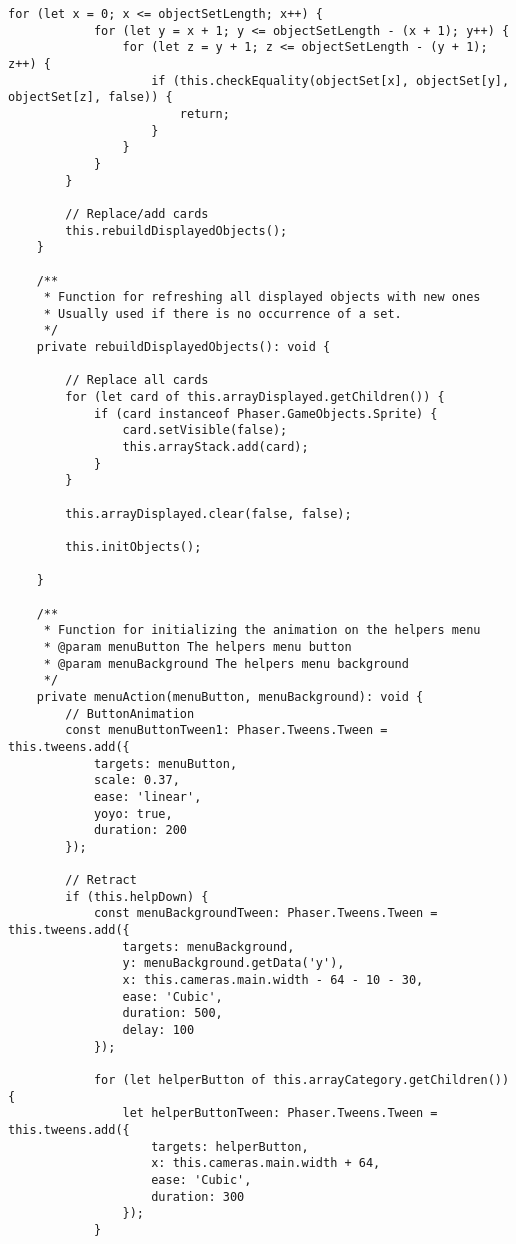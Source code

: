 \begin{lstlisting}[style=TypeScript, caption={gameScene.ts}]
        for (let x = 0; x <= objectSetLength; x++) {
            for (let y = x + 1; y <= objectSetLength - (x + 1); y++) {
                for (let z = y + 1; z <= objectSetLength - (y + 1); z++) {
                    if (this.checkEquality(objectSet[x], objectSet[y], objectSet[z], false)) {
                        return;
                    }
                }
            }
        }

        // Replace/add cards
        this.rebuildDisplayedObjects();
    }

    /**
     * Function for refreshing all displayed objects with new ones
     * Usually used if there is no occurrence of a set.
     */
    private rebuildDisplayedObjects(): void {

        // Replace all cards
        for (let card of this.arrayDisplayed.getChildren()) {
            if (card instanceof Phaser.GameObjects.Sprite) {
                card.setVisible(false);
                this.arrayStack.add(card);
            }
        }

        this.arrayDisplayed.clear(false, false);

        this.initObjects();

    }

    /**
     * Function for initializing the animation on the helpers menu
     * @param menuButton The helpers menu button
     * @param menuBackground The helpers menu background
     */
    private menuAction(menuButton, menuBackground): void {
        // ButtonAnimation
        const menuButtonTween1: Phaser.Tweens.Tween = this.tweens.add({
            targets: menuButton,
            scale: 0.37,
            ease: 'linear',
            yoyo: true,
            duration: 200
        });

        // Retract
        if (this.helpDown) {
            const menuBackgroundTween: Phaser.Tweens.Tween = this.tweens.add({
                targets: menuBackground,
                y: menuBackground.getData('y'),
                x: this.cameras.main.width - 64 - 10 - 30,
                ease: 'Cubic',
                duration: 500,
                delay: 100
            });

            for (let helperButton of this.arrayCategory.getChildren()) {
                let helperButtonTween: Phaser.Tweens.Tween = this.tweens.add({
                    targets: helperButton,
                    x: this.cameras.main.width + 64,
                    ease: 'Cubic',
                    duration: 300
                });
            }



\end{lstlisting}
